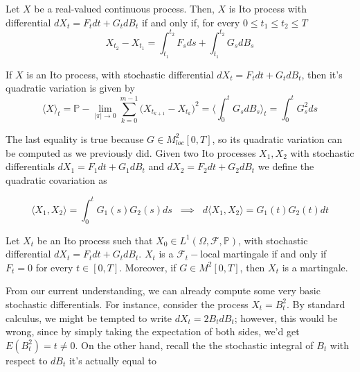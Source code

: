 \begin{proposition}
    Let $X$ be a real-valued continuous process. Then, $X$ is Ito process with differential $dX_t = F_t dt + G_t dB_t$ if and only if, for every $0 \leq t_1 \leq t_2 \leq T$
    \begin{equation*}
        X_{t_2}-X_{t_1} = \int_{t_1}^{t_2} F_s ds + \int_{t_1}^{t_2} G_s dB_s
    \end{equation*}
\end{proposition}

\begin{theorem}
    If $X$ is an Ito process, with stochastic differential $dX_t = F_t dt+G_t dB_t$, then it's quadratic variation is given by 
    \begin{equation*}
        \langle X \rangle_t = \mathbb{P}-\lim_{\vert \pi \vert \to 0} \sum_{k=0}^{m-1} \big( X_{t_{k+1}}-X_{t_k} \big)^2 = \Big\langle \int_0^t G_s dB_s \Big\rangle_t = \int_0^t G_s^2 ds
    \end{equation*}
\end{theorem}

The last equality is true because $G \in M^2_{loc}[0,T]$, so its quadratic variation can be computed as we previously did.
Given two Ito processes $X_1,X_2$ with stochastic differentials $dX_1 = F_1dt+G_1dB_t$ and $dX_2 = F_2dt+G_2dB_t$ we define the quadratic covariation as 

\begin{equation*}
    \langle X_1,X_2 \rangle = \int_0^t G_1(s) G_2(s) ds \;\; \implies \;\; d\langle X_1, X_2 \rangle = G_1(t) G_2(t) dt 
\end{equation*}

\begin{theorem}
    Let $X_t$ be an Ito process such that $X_0 \in L^1(\Omega, \mathcal{F}, \mathbb{P})$, with stochastic differential $dX_t = F_t dt + G_t dB_t$. $X_t$ is a $\mathcal{F}_t-$local martingale if and only if $F_t = 0$ for every $t \in [0,T]$. Moreover, if $G \in M^2[0,T]$, then $X_t$ is a martingale.
\end{theorem}

From our current understanding, we can already compute some very basic stochastic differentials. For instance, consider the process $X_t = B_t^2$. By standard calculus, we might be tempted to write $dX_t = 2B_t dB_t$; however, this would be wrong, since by simply taking the expectation of both sides, we'd get $E(B_t^2) = t \neq 0$. On the other hand, recall the the stochastic integral of $B_t$ with respect to $dB_t$ it's actually equal to 

